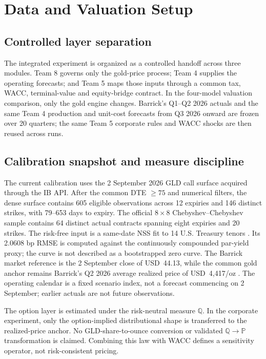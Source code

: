 \section{Data and Valuation Setup}

\subsection{Controlled layer separation}
The integrated experiment is organized as a controlled handoff across three modules. Team 8 governs only the gold-price process; Team 4 supplies the operating forecasts; and Team 5 maps those inputs through a common tax, WACC, terminal-value and equity-bridge contract. In the four-model valuation comparison, only the gold engine changes. Barrick's Q1--Q2 2026 actuals and the same Team 4 production and unit-cost forecasts from Q3 2026 onward are frozen over 20 quarters; the same Team 5 corporate rules and WACC shocks are then reused across runs.



\subsection{Calibration snapshot and measure discipline}
The current calibration uses the 2 September 2026 GLD call surface acquired through the IB API. After the common DTE $\geq75$ and numerical filters, the dense surface contains 605 eligible observations across 12 expiries and 146 distinct strikes, with 79--653 days to expiry. The official $8\times8$ Chebyshev--Chebyshev sample contains 64 distinct actual contracts spanning eight expiries and 20 strikes. The risk-free input is a same-date NSS fit to 14 U.S. Treasury tenors \citep{nss1994,treasury2026}. Its 2.0608 bp RMSE is computed against the continuously compounded par-yield proxy; the curve is not described as a bootstrapped zero curve. The Barrick market reference is the 2 September close of USD~44.13, while the common gold anchor remains Barrick's Q2 2026 average realized price of USD~4,417/oz \citep{barrick2026}. The operating calendar is a fixed scenario index, not a forecast commencing on 2 September; earlier actuals are not future observations.

The option layer is estimated under the risk-neutral measure $\mathbb Q$. In the corporate experiment, only the option-implied distributional shape is transferred to the realized-price anchor. No GLD-share-to-ounce conversion or validated $\mathbb Q\rightarrow\mathbb P$ transformation is claimed. Combining this law with WACC defines a sensitivity operator, not risk-consistent pricing.

